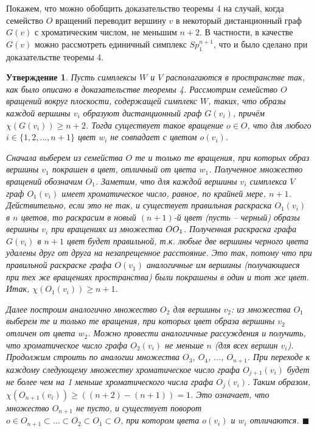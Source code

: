 \documentclass{report}%
\newtheorem{claim}[theorem]{Утверждение}
\newenvironment{proof}{\par\noindent{\bf Доказательство.}}{\hfill$\scriptstyle\blacksquare$}
\begin{document}
Покажем, что можно обобщить доказательство теоремы 4 на случай, 
когда семейство $O$ вращений переводит вершину $v$ в некоторый дистанционный граф $G(v)$ 
с хроматическим числом, не меньшим $n + 2$. В частности, в качестве $G(v)$ 
можно рассмотреть единичный симплекс $Sp_1^{n+1}$, что и было сделано при доказательстве теоремы 4.

\begin{claim}
		Пусть симплексы $W$ и $V$ располагаются в пространстве так, как было описано в доказательстве теоремы 4.
		Рассмотрим семейство $O$ вращений вокруг плоскости, содержащей симплекс $W$, таких,
		что образы каждой вершины $v_i$ образуют дистанционный граф $G(v_i)$, причём $\chi(G(v_i)) \geq n+2$.
		Тогда существует такое вращение $o \in O$, что для любого $i \in \{1, 2, \ldots, n + 1\}$ цвет $w_i$ не совпадает с цветом $o(v_i)$. \\
		\begin{proof}
				Сначала выберем из семейства $O$ те и только те вращения, при которых образ вершины $v_1$ покрашен в цвет,
				отличный от цвета $w_1$. Полученное множество вращений обозначим $O_1$.
				Заметим, что для каждой вершины $v_i$ симплекса $V$ граф $O_1(v_i)$ имеет хроматическое число, равное, по крайней мере, $n+1$.
				Действительно, если это не так, и существует правильная раскраска $O_1(v_i)$ в $n$ цветов,
				то раскрасим в новый $(n+1)$-й цвет (пусть – черный) образы вершины $v_i$ при вращениях из множества $O \\ O_1$.
				Полученная раскраска графа $G(v_i)$ в $n+1$ цвет будет правильной,
				т.к. любые две вершины черного цвета удалены друг от друга на незапрещенное расстояние.
				Это так, потому что при правильной раскраске графа $O(v_1)$ аналогичные им вершины (получающиеся при тех же вращениях пространства)
				были покрашены в один и тот же цвет. Итак, $\chi(O_1(v_i)) \geq n+1$.
				
				Далее построим аналогично множество $O_2$ для вершины $v_2$: из множества $O_1$ выберем те и только те вращения,
				при которых цвет образа вершины $v_2$ отличен от цвета $w_2$. Можно провести аналогичные рассуждения и получить,
				что хроматическое число графа $O_2(v_i)$ не меньше $n$ (для всех вершин $v_i$).
				Продолжим строить по аналогии множества $O_3$, $O_4$, $\ldots$, $O_{n+1}$.
				При переходе к каждому следующему множеству хроматическое число графа $O_{j+1}(v_i)$
				будет не более чем на 1 меньше хроматического числа графа $O_j(v_i)$.
				Таким образом, $\chi(O_{n+1}(v_i)) \geq ((n+2)-(n+1)) = 1$. Это означает, что множество $O_{n+1}$ не пусто,
				и существует поворот $o \in O_{n+1} \subset \ldots \subset O_2 \subset O_1 \subset O$, при котором цвета $o(v_i)$ и $w_i$ отличаются. 
		\end{proof}
\end{claim}
\end{document}
